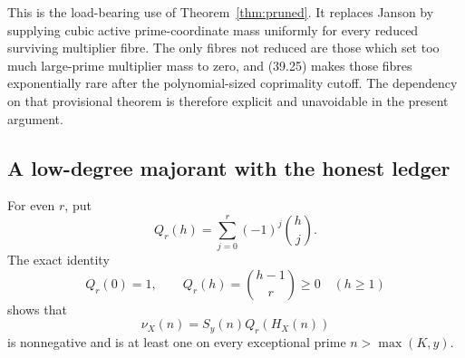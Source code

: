 \documentclass[10pt,reqno]{amsart}
\theoremstyle{definition}
\newcommand{\1}{\mathbf 1}
\begin{document}
This is the load-bearing use of Theorem~\ref{thm:pruned}.  It replaces
Janson by supplying cubic active prime-coordinate mass uniformly for every
reduced surviving multiplier fibre.  The only fibres not reduced are those
which set too much large-prime multiplier mass to zero, and (39.25) makes
those fibres exponentially rare after the polynomial-sized coprimality
cutoff.  The dependency on that provisional theorem is therefore explicit
and unavoidable in the present argument.

\subsection{A low-degree majorant with the honest ledger}
For even $r$, put
\[
 Q_r(h)=\sum_{j=0}^r(-1)^j\binom hj.
\]
The exact identity
\begin{equation}\tag{39.28}
 Q_r(0)=1,\qquad Q_r(h)=\binom{h-1}r\geq0\quad(h\geq1)
\end{equation}
shows that
\begin{equation}\tag{39.29}
 \nu_X(n)=S_y(n)Q_r(H_X(n))
\end{equation}
is nonnegative and is at least one on every exceptional prime
$n>\max(K,y)$.
\end{document}
